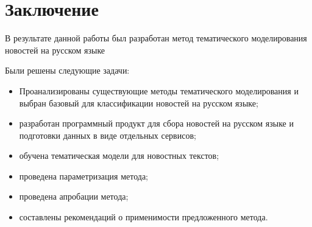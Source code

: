 \chapter*{Заключение}

В результате данной работы был разработан метод тематического моделирования новостей на русском языке

Были решены следующие задачи:



\begin{itemize}
    \item Проанализированы существующие методы тематического моделирования и выбран базовый для классификации новостей на русском языке;
    \item разработан программный продукт для сбора новостей на русском языке и подготовки данных в виде отдельных сервисов;
    \item обучена тематическая модели для новостных текстов;
    \item проведена параметризация метода;
    \item проведена апробации метода;
    \item составлены рекомендаций о применимости предложенного метода.
\end{itemize}


